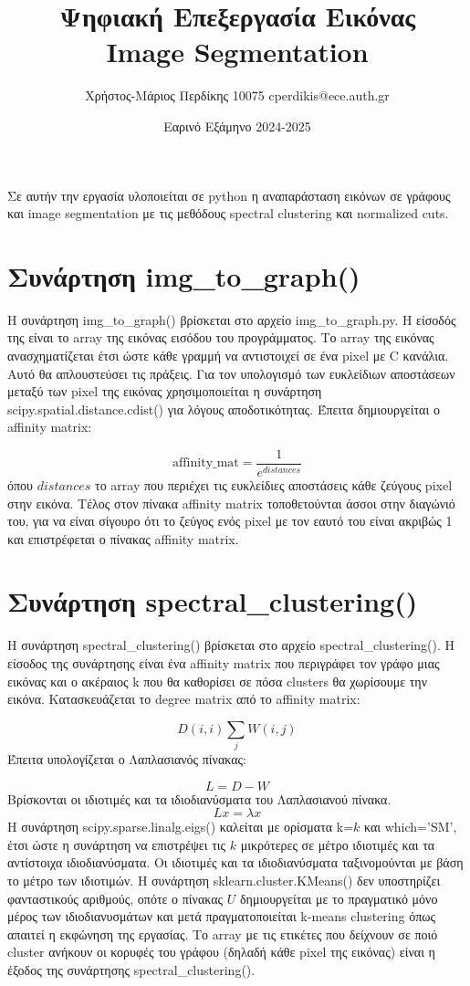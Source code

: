 \documentclass{article}
\title{Ψηφιακή Επεξεργασία Εικόνας \\ Image Segmentation}
\date{Εαρινό Εξάμηνο 2024-2025}
\author{Χρήστος-Μάριος Περδίκης 10075 cperdikis@ece.auth.gr}
\begin{document}
\maketitle
Σε αυτήν την εργασία υλοποιείται σε python η αναπαράσταση εικόνων σε γράφους και image
segmentation με τις μεθόδους spectral clustering και normalized cuts.


\section{Συνάρτηση img\_to\_graph()}
Η συνάρτηση img\_to\_graph() βρίσκεται στο αρχείο img\_to\_graph.py. Η είσοδός της
είναι το array της εικόνας εισόδου του προγράμματος. Το array της εικόνας 
ανασχηματίζεται έτσι ώστε κάθε γραμμή να αντιστοιχεί σε ένα pixel με C κανάλια.
Αυτό θα απλουστεύσει τις πράξεις. Για τον υπολογισμό των ευκλείδιων αποστάσεων 
μεταξύ των pixel της εικόνας χρησιμοποιείται η συνάρτηση scipy.spatial.distance.cdist()
για λόγους αποδοτικότητας. Έπειτα δημιουργείται ο affinity matrix:

\begin{equation}
    \text{affinity\_mat} = \frac{1}{e^{distances}}
\end{equation}
όπου $distances$ το array που περιέχει τις ευκλείδιες αποστάσεις κάθε ζεύγους
pixel στην εικόνα. Τέλος στον πίνακα affinity matrix τοποθετούνται άσσοι στην
διαγώνιό του, για να είναι σίγουρο ότι το ζεύγος ενός pixel με τον εαυτό του
είναι ακριβώς 1 και επιστρέφεται ο πίνακας affinity matrix.

\section{Συνάρτηση spectral\_clustering()}
Η συνάρτηση spectral\_clustering() βρίσκεται στο αρχείο spectral\_clustering().
Η είσοδος της συνάρτησης είναι ένα affinity matrix που περιγράφει τον γράφο μιας
εικόνας και ο ακέραιος k που θα καθορίσει σε πόσα clusters θα χωρίσουμε την εικόνα.
Κατασκευάζεται το degree matrix από το affinity matrix:

\begin{equation}
    D(i, i) \sum_j W(i, j)
\end{equation}
Έπειτα υπολογίζεται ο Λαπλασιανός πίνακας:

\begin{equation}
    L = D - W
\end{equation}
Βρίσκονται οι ιδιοτιμές και τα ιδιοδιανύσματα του Λαπλασιανού πίνακα. 
\begin{equation}
    Lx = \lambda x
\end{equation}
Η συνάρτηση scipy.sparse.linalg.eigs() καλείται με ορίσματα k=$k$ και 
which='SM', έτσι ώστε η συνάρτηση να επιστρέψει τις $k$ μικρότερες σε μέτρο
ιδιοτιμές και τα αντίστοιχα ιδιοδιανύσματα. Οι ιδιοτιμές και τα ιδιοδιανύσματα
ταξινομούνται με βάση το μέτρο των ιδιοτιμών. Η συνάρτηση sklearn.cluster.KMeans()
δεν υποστηρίζει φανταστικούς αριθμούς, οπότε ο πίνακας $U$ δημιουργείται με
το πραγματικό μόνο μέρος των ιδιοδιανυσμάτων και μετά πραγματοποιείται k-means 
clustering όπως απαιτεί η εκφώνηση της εργασίας. Το array με τις ετικέτες που 
δείχνουν σε ποιό cluster ανήκουν οι κορυφές του γράφου (δηλαδή κάθε pixel της
εικόνας) είναι η έξοδος της συνάρτησης spectral\_clustering().
\end{document}
